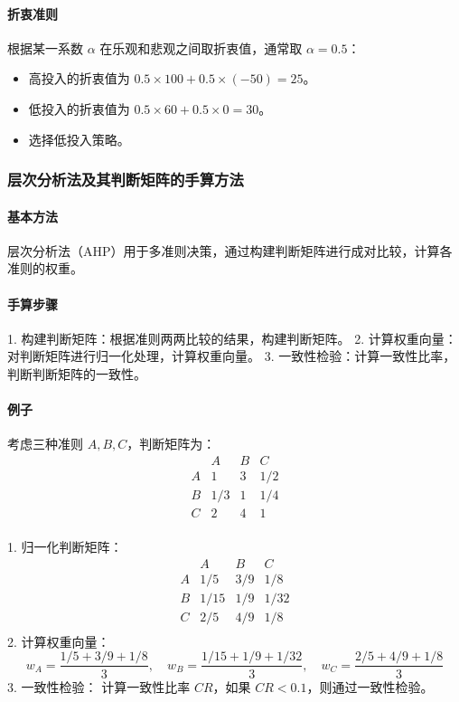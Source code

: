 \documentclass[UTF8]{ctexart}
\begin{document}
\paragraph{折衷准则}
根据某一系数 \(\alpha\) 在乐观和悲观之间取折衷值，通常取 \(\alpha = 0.5\)：
\begin{itemize}
    \item 高投入的折衷值为 \(0.5 \times 100 + 0.5 \times (-50) = 25\)。
    \item 低投入的折衷值为 \(0.5 \times 60 + 0.5 \times 0 = 30\)。
    \item 选择低投入策略。
\end{itemize}

\subsubsection{层次分析法及其判断矩阵的手算方法}
\paragraph{基本方法}
层次分析法（AHP）用于多准则决策，通过构建判断矩阵进行成对比较，计算各准则的权重。
\paragraph{手算步骤}
1. 构建判断矩阵：根据准则两两比较的结果，构建判断矩阵。
2. 计算权重向量：对判断矩阵进行归一化处理，计算权重向量。
3. 一致性检验：计算一致性比率，判断判断矩阵的一致性。

\paragraph{例子}
考虑三种准则 \(A, B, C\)，判断矩阵为：
\[
\begin{array}{c|ccc}
 & A & B & C \\
\hline
A & 1 & 3 & 1/2 \\
B & 1/3 & 1 & 1/4 \\
C & 2 & 4 & 1 \\
\end{array}
\]

1. 归一化判断矩阵：
\[
\begin{array}{c|ccc}
 & A & B & C \\
\hline
A & 1/5 & 3/9 & 1/8 \\
B & 1/15 & 1/9 & 1/32 \\
C & 2/5 & 4/9 & 1/8 \\
\end{array}
\]
2. 计算权重向量：
\[
w_A = \frac{1/5 + 3/9 + 1/8}{3}, \quad w_B = \frac{1/15 + 1/9 + 1/32}{3}, \quad w_C = \frac{2/5 + 4/9 + 1/8}{3}
\]
3. 一致性检验：
计算一致性比率 \(CR\)，如果 \(CR < 0.1\)，则通过一致性检验。
\end{document}
